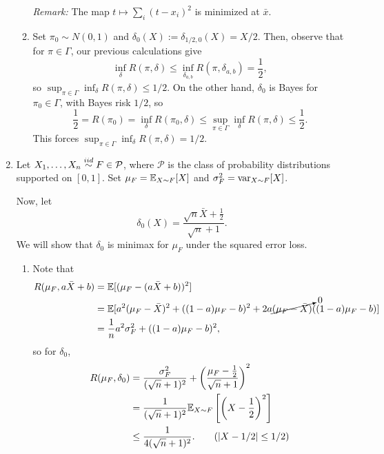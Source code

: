 \documentclass[11pt]{article}
\begin{document}
\begin{enumerate}
\begin{enumerate}
            \emph{Remark:} The map $t \mapsto \sum_i (t - x_i)^2$ is minimized
            at $\bar{x}$.

            \item Set $\pi_0 \sim N(0, 1)$ and $\delta_0(X) := \delta_{1 /2,
            0}(X) = X/2$.
            Then, observe that for $\pi \in \Gamma$, our previous calculations give \[
                \inf_\delta R(\pi, \delta)
                    \leq \inf_{\delta_{a, b}} R(\pi, \delta_{a, b})
                    = \frac{1}{2},
            \] so $\sup_{\pi \in \Gamma} \inf_{\delta} R(\pi, \delta) \leq 1 / 2$.
            On the other hand, $\delta_0$ is Bayes for $\pi_0 \in \Gamma$, with
            Bayes risk $1/2$, so \[
                \frac{1}{2}
                    = R(\pi_0)
                    = \inf_\delta R(\pi_0, \delta)
                    \leq \sup_{\pi \in \Gamma} \inf_\delta R(\pi, \delta)
                    \leq \frac{1}{2}.
            \] This forces $\sup_{\pi \in \Gamma} \inf_{\delta} R(\pi, \delta)
            = 1 / 2$.
        \end{enumerate}



        \item Let $X_1, \dots, X_n \overset{iid}{\sim} F \in \mathcal{P}$, where $\mathcal{P}$
        is the class of probability distributions supported on $[0, 1]$.
        Set $\mu_F = \mathbb{E}_{X \sim F}[X]$ and $\sigma^2_F = \operatorname{var}_{X \sim F}[X]$.

        Now, let \[
            \delta_0(X) = \frac{\sqrt{n}\bar{X} + \frac{1}{2}}{\sqrt{n} + 1}.
        \] We will show that $\delta_0$ is minimax for $\mu_F$ under the
        squared error loss.

        \begin{enumerate}
            \item Note that \begin{align*}
                R(\mu_F, a\bar{X} + b)
                    &= \mathbb{E}[(\mu_F - (a\bar{X} + b))^2] \\
                    &= \mathbb{E}[a^2(\mu_F - \bar{X})^2 + ((1 - a)\mu_F - b)^2 + 2a\cancelto{0}{(\mu_F - \bar{X})}((1 - a)\mu_F - b)] \\
                    &= \frac{1}{n}a^2\sigma^2_F + ((1 - a)\mu_F - b)^2,
            \end{align*}
            so for $\delta_0$, \begin{align*}
                R(\mu_F, \delta_0)
                    &= \frac{\sigma^2_F}{(\sqrt{n} + 1)^2} + \left(\frac{\mu_F - \frac{1}{2}}{\sqrt{n} + 1}\right)^2 \\
                    &= \frac{1}{(\sqrt{n} + 1)^2} \mathbb{E}_{X\sim F}\left[\left(X - \frac{1}{2}\right)^2\right] \\
                    &\leq \frac{1}{4(\sqrt{n} + 1)^2}. \tag{$|X - 1 / 2| \leq 1 / 2$}
            \end{align*}


\end{enumerate}
\end{enumerate}
\end{document}

